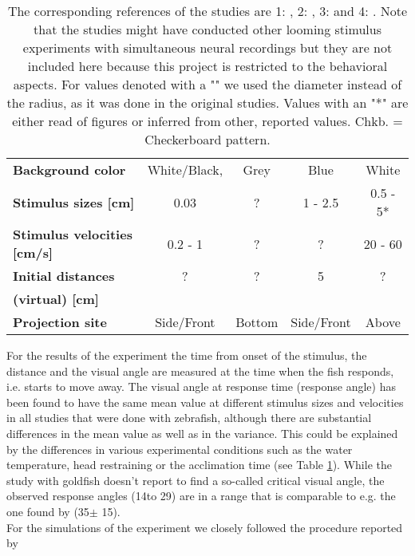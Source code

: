 \documentclass[a4paper,10pt,hidelinks]{scrreprt}
\begin{document}
\begin{table} [!th]
\begin{center}
\begin{tabular}{l|c|c|c|c}
				\textbf{Background color} & White/Black, & Grey & Blue & White\\
				\textbf{Stimulus sizes [cm]} & 0.03 & ? & 1 - 2.5 & 0.5 - 5*\\
				\textbf{Stimulus velocities [cm/s]} & 0.2 - 1 & ? & ? & 20 - 60\\
				\textbf{Initial distances} & ? & ? & 5 & ?\\
				\textbf{(virtual) [cm]} &  &  &  & \\
				\textbf{Projection site} & Side/Front & Bottom & Side/Front & Above\\
			\end{tabular}
		\end{center}
		\caption{The corresponding references of the studies are 1: \cite{Temizer2015}, 
		2: \cite{Dunn2016}, 3: \cite{Bhattacharyya2017} and 4: \cite{Preuss2006}.
		Note that the studies might have conducted other looming stimulus experiments with 
		simultaneous neural recordings but they are not included here because this project is 
		restricted to the behavioral aspects.
		For values denoted with a "\dag" we used the diameter 
		instead of the radius, as it was done in the original studies.
		Values with an "*" are either 
		read of figures or inferred from other, reported values. Chkb. = Checkerboard pattern.}
		\label{tab:looming_exp}
	\end{table}
	For the results of the experiment the time from onset of the stimulus, the distance and the 
	visual angle are measured at the time when the fish responds, i.e. starts to move away.
	The visual angle at response time (response angle) has been found to have the same mean value 
	at different stimulus sizes and velocities in all studies that were done with zebrafish, 
	although there are substantial differences in the mean value as well as in the variance.
	This could be explained by the differences in various experimental conditions such as the water 
	temperature, head restraining or the acclimation time (see Table \ref{tab:looming_exp}).
	While the study with goldfish \citep{Preuss2006} doesn't report to find a so-called critical 
	visual angle, the observed response angles (14\textdegree to 29\textdegree) are in a range 
	that is comparable to e.g. the one found by \cite{Bhattacharyya2017} (35\textdegree $\pm$ 
	15\textdegree).\\
	For the simulations of the experiment we closely followed the procedure reported by 
\end{document}
